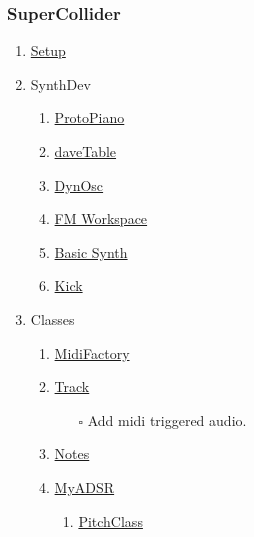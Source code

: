 \documentclass[12pt,twoside]{article}
\begin{document}
\subsubsection{SuperCollider}
\label{sec:orgb3bb32b}
\begin{enumerate}
\item \href{../../Music/SuperCollider/include/setup.sc}{Setup}
\label{sec:org65e5642}
\item SynthDev
\label{sec:org7428751}
\begin{enumerate}
\item \href{../../Music/SuperCollider/include/Synths/protopiano.sc}{ProtoPiano}
\label{sec:orga66cea3}
\item \href{../../Music/SuperCollider/include/Synths/daveTable.sc}{daveTable}
\label{sec:org1eb760c}
\item \href{../../Music/SuperCollider/include/Synths/dynOsc.sc}{DynOsc}
\label{sec:orgd3309fe}
\item \href{file:///home/dbalchen/Music/SuperCollider/include/Synths/fmWorkspace.sc}{FM Workspace}
\label{sec:orgf30d11a}
\item \href{../../Music/SuperCollider/include/Synths/basic.sc}{Basic Synth}
\label{sec:org4a4e4e7}
\item \href{../../Music/SuperCollider/include/Synths/kick.sc}{Kick}
\label{sec:org5380953}
\end{enumerate}
\item Classes
\label{sec:org55c739c}
\begin{enumerate}
\item \href{../../Music/SuperCollider/include/Classes/MidiFactory.sc}{MidiFactory}
\label{sec:org8040360}
\item \href{../../Music/SuperCollider/include/Classes/Track.sc}{Track}
\label{sec:orgbfae389}
\begin{itemize}
\item[{$\square$}] Add midi triggered audio.
\end{itemize}
\item \href{../../Music/SuperCollider/include/Classes/Notes.sc}{Notes}
\label{sec:org47622e4}
\item \href{../../Music/SuperCollider/include/Classes/MyADSR.sc}{MyADSR}
\label{sec:org8ba7206}
\begin{enumerate}
\item \href{../../Music/SuperCollider/include/functions/PitchClass.sc}{PitchClass}
\label{sec:org8542594}
\end{enumerate}
\end{enumerate}

\end{enumerate}
\end{document}
